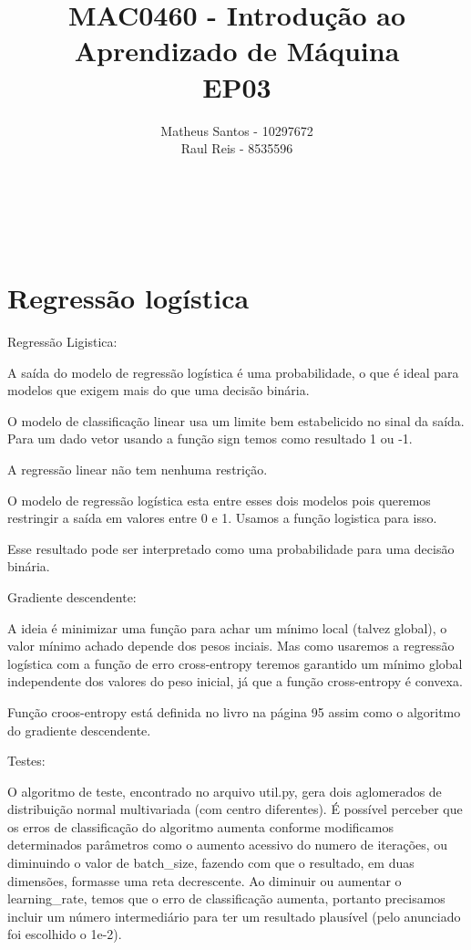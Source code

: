 \documentclass[12pt, a4paper]{article}
\title{MAC0460 - Introdução ao Aprendizado de Máquina \\ EP03}
\author{Matheus Santos - 10297672 \\
        Raul Reis - 8535596}
\begin{document}
\makeatletter
\begin{center}
	{\Large\textbf \@title \\ }
	{\Large \@author \\ }
\end{center}

\vspace{1.1cm}

\section{Regressão logística}

Regressão Ligistica:

A saída do modelo de regressão logística é uma probabilidade, o que é
ideal para modelos que exigem mais do que uma decisão binária.

O modelo de classificação linear usa um limite bem estabelicido no sinal
da saída. Para um dado vetor usando a função sign temos como resultado 1 ou -1.

A regressão linear não tem nenhuma restrição.

O modelo de regressão logística esta entre esses dois modelos pois queremos restringir
a saída em valores entre 0 e 1. Usamos a função logistica para isso.

Esse resultado pode ser interpretado como uma probabilidade para uma decisão binária.


Gradiente descendente:


A ideia é minimizar uma função para achar um mínimo local (talvez global), o valor
mínimo achado depende dos pesos inciais. Mas como usaremos a regressão logística com
a função de erro cross-entropy teremos garantido um mínimo global independente dos 
valores do peso inicial, já que a função cross-entropy é convexa.

Função croos-entropy está definida no livro na página 95 assim como o algoritmo do
gradiente descendente.

Testes: 

O algoritmo de teste, encontrado no arquivo util.py, gera dois aglomerados de distribuição normal multivariada (com centro diferentes). É possível perceber que os erros de classificação do algoritmo aumenta conforme modificamos determinados parâmetros como o aumento acessivo do numero de iterações, ou diminuindo o valor de batch_size, fazendo com que o resultado, em duas dimensões, formasse uma reta decrescente. Ao diminuir ou aumentar o learning_rate, temos que o erro de classificação aumenta, portanto precisamos incluir um número intermediário para ter um resultado plausível (pelo anunciado foi escolhido o 1e-2). 
\end{document}
